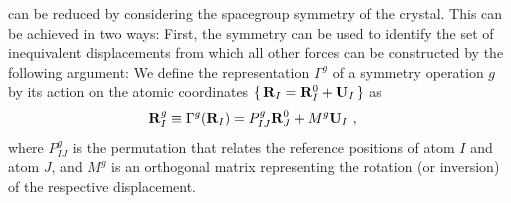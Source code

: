  can be reduced by considering the spacegroup symmetry of the crystal. This can be achieved in two ways: First, the symmetry can be used to identify the set of inequivalent displacements from which all other forces can be constructed by the following argument: We define the representation $\Gamma^g$ of a symmetry operation $g$ by its action on the atomic coordinates $\set{{\bf R}_I = {\bf R}_I^0 + {\bf U}_I}$ as
\begin{align}
\b R_I^{g} &\equiv {\Gamma}^g (\b R_I) = { P}^g_{IJ} \b R^0_J + { M}^g \b U_I~,
\label{eq:sym.RI'}
\end{align}	
where $P^g_{IJ}$ is the permutation that relates the reference positions of atom $I$ and atom $J$, and $M^g$ is an orthogonal matrix representing the rotation (or inversion) of the respective displacement.\begin{marginfigure}
	\centering

\end{marginfigure}
